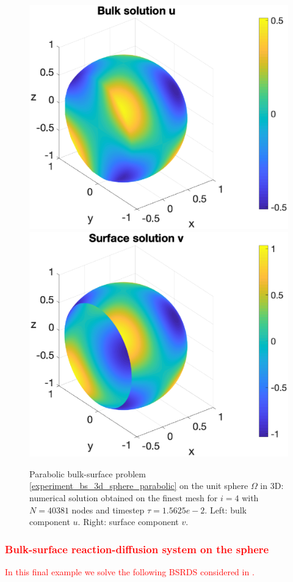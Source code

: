 \documentclass[a4paper]{article}
\newcommand{\red}[1]{\textcolor{red}{#1}}
\begin{document}
\begin{figure}[H]
\begin{center}
\hspace*{-10mm}
\includegraphics[scale=0.4]{bs_3d_sphere_nx41_parabolic_u.eps}
\hspace*{-5mm}
\includegraphics[scale=0.4]{bs_3d_sphere_nx41_parabolic_v.eps}
\end{center}
\caption{Parabolic bulk-surface  problem \eqref{experiment_bs_3d_sphere_parabolic} on the unit sphere $\Omega$ in 3D: numerical solution obtained on the finest mesh for $i=4$ with $N= 40381$ nodes and timestep $\tau = 1.5625e-2$. Left: bulk component $u$. Right: surface component $v$.}
\label{fig:bs_3d_numsol_sphere_parabolic}
\end{figure} 

\subsubsection{\red{Bulk-surface reaction-diffusion system on the sphere}}
\label{sec:example_bsrds_sphere}
\red{In this final example we solve the following BSRDS considered in \cite{frittelli2023bsrds}.}
 


 
\end{document}
